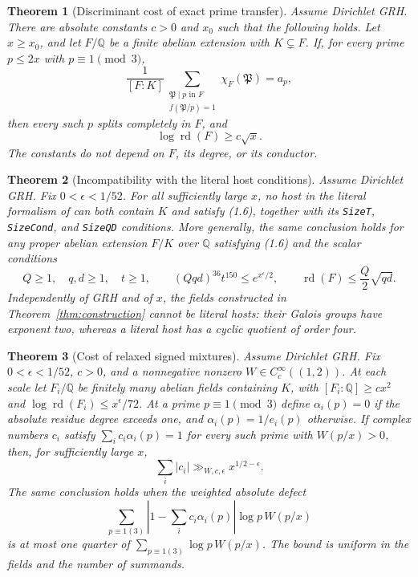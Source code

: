 \documentclass[11pt]{article}
\newtheorem{theorem}{Theorem}[section]
\theoremstyle{remark}\newtheorem{remark}[theorem]{Remark}
\newcommand{\Q}{\mathbb Q}
\newcommand{\rd}{\operatorname{rd}}
\begin{document}
\begin{theorem}[Discriminant cost of exact prime transfer]
\label{thm:discriminant}
Assume Dirichlet GRH. There are absolute constants $c>0$ and $x_0$
such that the following holds. Let $x\ge x_0$, and let $F/\Q$
be a finite abelian extension with $K\subsetneq F$. If, for every
prime $p\le2x$ with $p\equiv1\pmod3$,
\[
 \frac1{[F:K]}
   \sum_{\substack{\mathfrak P\mid p\text{ in }F\\
                    f(\mathfrak P/p)=1}}
                \chi_F(\mathfrak P)=a_p,
                                                        \tag{1.6}
\]
then every such $p$ splits completely in $F$, and
\[
                         \log\rd(F)\ge c\sqrt{x}.
                                                        \tag{1.7}
\]
The constants do not depend on $F$, its degree, or its conductor.
\end{theorem}

\begin{theorem}[Incompatibility with the literal host conditions]
\label{thm:literal}
Assume Dirichlet GRH. Fix $0<\epsilon<1/52$. For all sufficiently
large $x$, no host in the literal formalism of \citet{AlpogeLean2026}
can both contain $K$ and satisfy (1.6), together with its
\texttt{SizeT}, \texttt{SizeCond}, and \texttt{SizeQD} conditions.
More generally, the same conclusion holds for any proper abelian
extension $F/K$ over $\Q$ satisfying (1.6) and the scalar conditions
\[
 Q\ge1,\quad q,d\ge1,\quad t\ge1,\qquad
 (Qqd)^{36}t^{150}\le e^{x^\epsilon/2},\qquad
 \rd(F)\le\frac Q2\sqrt{qd}.
                                                        \tag{1.8}
\]
Independently of GRH and of $x$, the fields constructed in
Theorem~\ref{thm:construction} cannot be literal hosts: their Galois
groups have exponent two, whereas a literal host has a cyclic
quotient of order four.
\end{theorem}

\begin{theorem}[Cost of relaxed signed mixtures]\label{thm:mixture-cost}
Assume Dirichlet GRH. Fix $0<\epsilon<1/52$, $c>0$, and a nonnegative
nonzero $W\in C_c^\infty((1,2))$. At each scale let $F_i/\Q$ be
finitely many abelian fields containing $K$, with
$[F_i:\Q]\ge c x^2$ and $\log\rd(F_i)\le x^\epsilon/72$.
At a prime $p\equiv1\pmod3$ define $\alpha_i(p)=0$ if the
absolute residue degree exceeds one, and $\alpha_i(p)=1/e_i(p)$
otherwise. If complex numbers $c_i$ satisfy
$\sum_i c_i\alpha_i(p)=1$ for every such prime with $W(p/x)>0$,
then, for sufficiently large $x$,
\[
                   \sum_i|c_i|\gg_{W,c,\epsilon}x^{1/2-\epsilon}.
\]
The same conclusion holds when the weighted absolute defect
\[
 \sum_{p\equiv1(3)}\left|1-\sum_i c_i\alpha_i(p)\right|
                       \log p\,W(p/x)
\]
is at most one quarter of
$\sum_{p\equiv1(3)}\log p\,W(p/x)$.
The bound is uniform in the fields and the number of summands.
\end{theorem}
\end{document}
